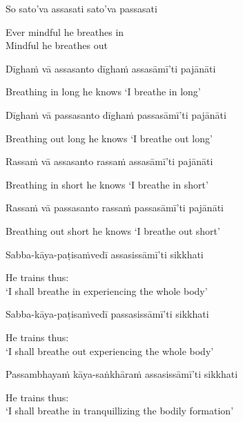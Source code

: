 So sato'va assasati sato'va passasati

\begin{english}
  Ever mindful he breathes in\\
  Mindful he breathes out
\end{english}

Dīghaṁ vā assasanto dīghaṁ assasāmī'ti pajānāti

\begin{english}
  Breathing in long he knows `I breathe in long'
\end{english}

Dīghaṁ vā passasanto dīghaṁ passasāmī'ti pajānāti

\begin{english}
  Breathing out long he knows `I breathe out long'
\end{english}

Rassaṁ vā assasanto rassaṁ assasāmī'ti pajānāti

\begin{english}
  Breathing in short he knows `I breathe in short'
\end{english}

Rassaṁ vā passasanto rassaṁ passasāmī'ti pajānāti

\begin{english}
  Breathing out short he knows `I breathe out short'
\end{english}

Sabba-kāya-paṭisaṁvedī assasissāmī'ti sikkhati

\begin{english}
  He trains thus:\\
  `I shall breathe in experiencing the whole body'
\end{english}

Sabba-kāya-paṭisaṁvedī passasissāmī'ti sikkhati

\begin{english}
  He trains thus:\\
  `I shall breathe out experiencing the whole body'
\end{english}

Passambhayaṁ kāya-saṅkhāraṁ assasissāmī'ti sikkhati

\begin{english}
  He trains thus:\\
  `I shall breathe in tranquillizing the bodily formation'\makeatletter\hyperlink{endnote68-appendix}\makeatother
\end{english}

